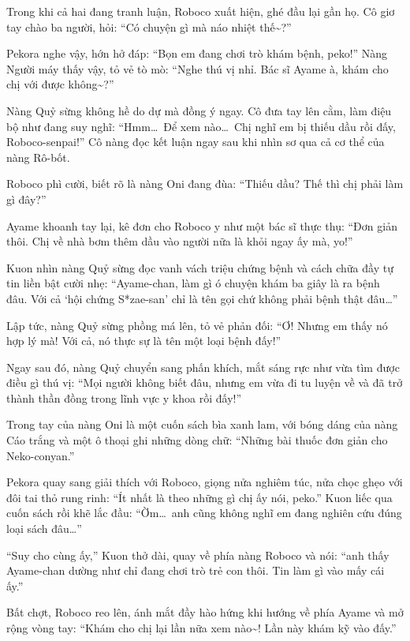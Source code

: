 \documentclass[../main.tex]{subfiles}
\begin{document}
Trong khi cả hai đang tranh luận, Roboco xuất hiện, ghé đầu lại gần họ. Cô giơ tay chào ba người, hỏi: ``Có chuyện gì mà náo nhiệt thế\~{}?''


Pekora nghe vậy, hớn hở đáp: ``Bọn em đang chơi trò khám bệnh, peko!'' Nàng Người máy thấy vậy, tỏ vẻ tò mò: ``Nghe thú vị nhỉ. Bác sĩ Ayame à, khám cho chị với được không\~{}?''

Nàng Quỷ sừng không hề do dự mà đồng ý ngay. Cô đưa tay lên cằm, làm điệu bộ như đang suy nghĩ: ``Hmm\dots\ Để xem nào\dots\ Chị nghĩ em bị thiếu dầu rồi đấy, Roboco-senpai!'' Cô nàng đọc kết luận ngay sau khi nhìn sơ qua cả cơ thể của nàng Rô-bốt.

Roboco phì cười, biết rõ là nàng Oni đang đùa: ``Thiếu dầu? Thế thì chị phải làm gì đây?''

Ayame khoanh tay lại, kê đơn cho Roboco y như một bác sĩ thực thụ: ``Đơn giản thôi. Chị về nhà bơm thêm dầu vào người nữa là khỏi ngay ấy mà, yo!''

Kuon nhìn nàng Quỷ sừng đọc vanh vách triệu chứng bệnh và cách chữa đầy tự tin liền bật cười nhẹ: ``Ayame-chan, làm gì ó chuyện khám ba giây là ra bệnh đâu. Với cả `hội chứng S*zae-san' chỉ là tên gọi chứ không phải bệnh thật đâu\dots''

Lập tức, nàng Quỷ sừng phồng má lên, tỏ vẻ phản đối: ``Ơ! Nhưng em thấy nó hợp lý mà! Với cả, nó thực sự là tên một loại bệnh đấy!''

Ngay sau đó, nàng Quỷ chuyển sang phấn khích, mắt sáng rực như vừa tìm được điều gì thú vị: ``Mọi người không biết đâu, nhưng em vừa đi tu luyện về và đã trở thành thần đồng trong lĩnh vực y khoa rồi đấy!''

Trong tay của nàng Oni là một cuốn sách bìa xanh lam, với bóng dáng của nàng Cáo trắng và một ô thoại ghi những dòng chữ: ``Những bài thuốc đơn giản cho Neko-conyan.''


Pekora quay sang giải thích với Roboco, giọng nửa nghiêm túc, nửa chọc ghẹo với đôi tai thỏ rung rinh: ``Ít nhất là theo những gì chị ấy nói, peko.'' Kuon liếc qua cuốn sách rồi khẽ lắc đầu: ``Ờm\dots\ anh cũng không nghĩ em đang nghiên cứu đúng loại sách đâu\dots''

``Suy cho cùng ấy,'' Kuon thở dài, quay về phía nàng Roboco và nói: ``anh thấy Ayame-chan dường như chỉ đang chơi trò trẻ con thôi. Tin làm gì vào mấy cái ấy.''

Bất chợt, Roboco reo lên, ánh mắt đầy hào hứng khi hướng về phía Ayame và mở rộng vòng tay: ``Khám cho chị lại lần nữa xem nào\~{}! Lần này khám kỹ vào đấy.''
\end{document}
